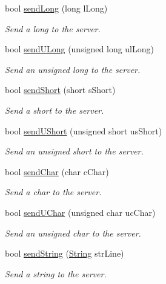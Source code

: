 \begin{DoxyCompactItemize}
bool \hyperlink{class_rad_j_a_v_1_1_networking_1_1wx_widgets_t_c_p_client_aaa40b254965bfc2b4d3b27877602da9c}{send\+Long} (long l\+Long)
\begin{DoxyCompactList}\small\item\em Send a long to the server. \end{DoxyCompactList}\item 
bool \hyperlink{class_rad_j_a_v_1_1_networking_1_1wx_widgets_t_c_p_client_a8440ad8c4446f1525329cfe40d630ead}{send\+U\+Long} (unsigned long ul\+Long)
\begin{DoxyCompactList}\small\item\em Send an unsigned long to the server. \end{DoxyCompactList}\item 
bool \hyperlink{class_rad_j_a_v_1_1_networking_1_1wx_widgets_t_c_p_client_afeb26d6478b3c8f869f67c41e3105bec}{send\+Short} (short s\+Short)
\begin{DoxyCompactList}\small\item\em Send a short to the server. \end{DoxyCompactList}\item 
bool \hyperlink{class_rad_j_a_v_1_1_networking_1_1wx_widgets_t_c_p_client_a909ddced28c91178cfc77be15e79751d}{send\+U\+Short} (unsigned short us\+Short)
\begin{DoxyCompactList}\small\item\em Send an unsigned short to the server. \end{DoxyCompactList}\item 
bool \hyperlink{class_rad_j_a_v_1_1_networking_1_1wx_widgets_t_c_p_client_a3fdaa69183625a5555d99da0a32c6700}{send\+Char} (char c\+Char)
\begin{DoxyCompactList}\small\item\em Send a char to the server. \end{DoxyCompactList}\item 
bool \hyperlink{class_rad_j_a_v_1_1_networking_1_1wx_widgets_t_c_p_client_ae50f5c377cd8116159f7afa5e7f0bbd5}{send\+U\+Char} (unsigned char uc\+Char)
\begin{DoxyCompactList}\small\item\em Send an unsigned char to the server. \end{DoxyCompactList}\item 
bool \hyperlink{class_rad_j_a_v_1_1_networking_1_1wx_widgets_t_c_p_client_a2282375d71da7b7d38ef06a977e46827}{send\+String} (\hyperlink{class_rad_j_a_v_1_1_string}{String} str\+Line)
\begin{DoxyCompactList}\small\item\em Send a string to the server. \end{DoxyCompactList}\item 

\end{DoxyCompactItemize}
